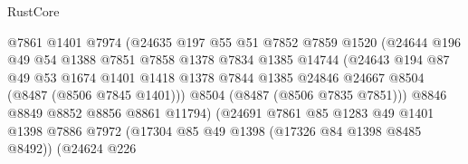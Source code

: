 \begin{lexlean}{RustCore}
\begin{coremodule}
                                    @7861
                                    @1401
                                    @7974
                                    (@24635
                                      @197
                                      @55
                                      @51
                                      @7852
                                      @7859
                                      @1520
                                      (@24644
                                        @196
                                        @49
                                        @54
                                        @1388
                                        @7851
                                        @7858
                                        @1378
                                        @7834
                                        @1385
                                        @14744
                                        (@24643
                                          @194
                                          @87
                                          @49
                                          @53
                                          @1674
                                          @1401
                                          @1418
                                          @1378
                                          @7844
                                          @1385
                                          @24846
                                          @24667
                                          @8504
                                          (@8487 (@8506 @7845 @1401)))
                                        @8504
                                        (@8487 (@8506 @7835 @7851)))
                                      @8846
                                      @8849
                                      @8852
                                      @8856
                                      @8861
                                      @11794)
                                    (@24691
                                      @7861
                                      @85
                                      @1283
                                      @49
                                      @1401
                                      @1398
                                      @7886
                                      @7972
                                      (@17304 @85 @49 @1398 (@17326 @84 @1398 @8485 @8492))
                                      (@24624
                                        @226

\end{coremodule}
\end{lexlean}
